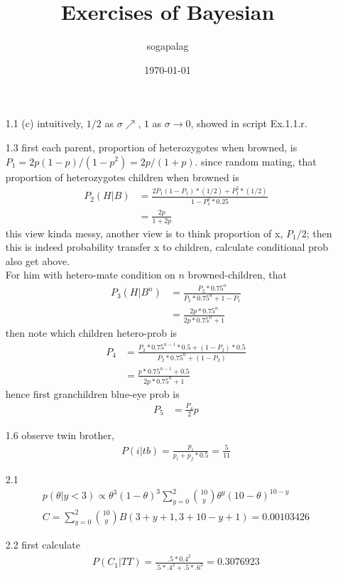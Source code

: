 \documentclass[paper=a4, fontsize=11pt]{scrartcl} %
\title{Exercises of Bayesian}
\author{sogapalag}
\date{\normalsize\today}
\numberwithin{equation}{section} %
\numberwithin{figure}{section} %
\numberwithin{table}{section} %
\begin{document}
\maketitle
\begin{itemize}
	\item[1.1] (c) intuitively, $1/2$ as $\sigma \nearrow$, $1$ as $\sigma\rightarrow 0$, showed in script Ex.1.1.r.
	\item[1.3] first each parent, proportion of heterozygotes when browned, is $P_1=2p(1-p)/(1-p^2)= 2p/(1+p)$. since random mating, that proportion of heterozygotes children when browned is
	\begin{align}
		P_2(H|B) &= \frac{2P_1(1-P_1)*(1/2)+ P_1^2*(1/2)}{1-P_1^2*0.25}\\
			&= \frac{2p}{1+2p}
	\end{align}
	this view kinda messy, another view is to think proportion of x, $P_1/2$; then this is indeed probability transfer x to children, calculate conditional prob also get above.\\
	For him with hetero-mate condition on $n$ browned-children, that
	\begin{align}
		P_3(H|B^n) &= \frac{P_2* 0.75^n}{P_2*0.75^n+ 1-P_1}\\
			&= \frac{2p*0.75^n}{2p*0.75^n+1}
	\end{align}
	then note which children hetero-prob is
	\begin{align}
		P_4 &= \frac{P_2*0.75^{n-1}*0.5+(1-P_2)*0.5}{P_2*0.75^n + (1-P_2)}\\
			&= \frac{p*0.75^{n-1}+0.5}{2p*0.75^n+1}
	\end{align}
	hence first granchildren blue-eye prob is
	\begin{align}
		P_5 &= \frac{P_4}{2}p
	\end{align}
	\item[1.6] observe twin brother,
	\begin{align}
		P(i|tb) = \frac{p_i}{p_i+p_f*0.5}=\frac{5}{11}
	\end{align}
	\item[2.1]
	\begin{align}
		p(\theta|y<3) \propto \theta^3(1-\theta)^3\sum_{y=0}^2{10\choose y} \theta^y(10-\theta)^{10-y}\\
		C = \sum_{y=0}^2 {10\choose y} B(3+y+1, 3+10-y+1)=0.00103426
	\end{align}
	\item[2.2] first calculate
	\begin{align}
		P(C_1|TT) = \frac{.5 * 0.4^2}{.5 * .4^2 + .5 *.6^2} = 0.3076923

\end{align}
\end{itemize}
\end{document}
